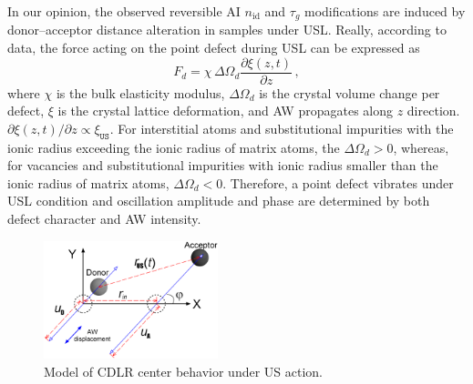 \documentclass[aip,jap, amsmath,amssymb,reprint]{revtex4-1}
\begin{document}
In our opinion, the observed reversible AI $n_{\mathrm{id}}$ and $\tau_g$ modifications are induced by
donor--acceptor distance alteration in samples under USL.
Really, according to data,\cite{MirzadeJAP2011,PeleshchakUJF2016} the force acting on the point defect during USL can be expressed as
\begin{equation}
\label{eqFd}
F_d=\chi\,\Delta\Omega_d\frac{\partial \xi(z,t)}{\partial z}\,,
\end{equation}
where
$\chi$ is the bulk elasticity modulus,
$\Delta\Omega_d$ is the crystal volume change per defect,
$\xi$ is the crystal lattice deformation,
and AW propagates along $z$ direction.
$\partial \xi(z,t)/\partial z\propto \xi_{\mathtt{US}}$.
For interstitial atoms and substitutional impurities with the ionic radius exceeding the ionic radius of matrix
atoms, the $\Delta\Omega_d > 0$, whereas,
for vacancies and substitutional impurities with ionic radius smaller than the ionic radius of matrix atoms,
$\Delta\Omega_d < 0$.
Therefore, a point defect vibrates under USL condition and oscillation amplitude and phase are determined by both defect character and AW intensity.

\begin{figure}
\includegraphics[width=0.45\textwidth]{olikhFig4}%
\caption{\label{fig_Model}
Model of CDLR center behavior under US action.
}%
\end{figure}
\end{document}
